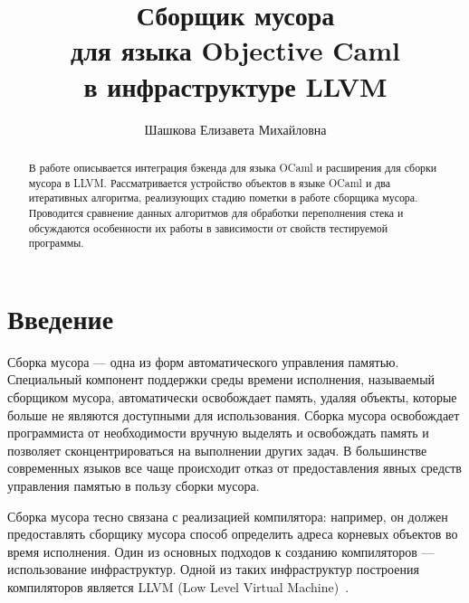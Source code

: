 \title{Сборщик мусора\\
для языка Objective Caml\\
в инфраструктуре LLVM}
%
\author{Шашкова Елизавета Михайловна}
%
%
%

\maketitle              %

\begin{abstract}
В работе описывается интеграция бэкенда для языка OCaml и расширения для сборки мусора в LLVM. 
Рассматривается устройство объектов в языке OCaml и два итеративных алгоритма, реализующих 
стадию пометки в работе сборщика мусора. Проводится сравнение данных алгоритмов для обработки 
переполнения стека и обсуждаются особенности их работы в зависимости от свойств тестируемой программы.
\end{abstract}

\section*{Введение}

Сборка мусора --- одна из форм автоматического управления памятью. Специальный компонент поддержки среды времени исполнения, 
называемый сборщиком мусора, автоматически освобождает 
память, удаляя объекты, которые больше не являются доступными для использования.  Сборка мусора освобождает программиста от 
необходимости вручную выделять и освобождать память и позволяет сконцентрироваться на выполнении других задач.
В большинстве современных языков все чаще происходит отказ от предоставления явных средств управления памятью в пользу сборки мусора.

Сборка мусора тесно связана с реализацией компилятора: например, он должен предоставлять сборщику мусора способ определить адреса корневых объектов во
время исполнения. Один из основных
подходов к созданию компиляторов --- использование инфраструктур. Одной из таких инфраструктур построения компиляторов является LLVM 
(Low Level Virtual Machine)~\cite{LLVM}. 

